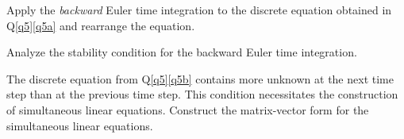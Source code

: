 \listbegin
\item Apply the \textit{backward} Euler time integration to the discrete equation obtained in Q\ref{q5}\ref{q5a} and rearrange the equation.



\item Analyze the stability condition for the backward Euler time integration.



\listclose

	
	\item The discrete equation from Q\ref{q5}\ref{q5b} contains more unknown at the next time step than at the previous time step. This condition necessitates the construction of simultaneous linear equations. Construct the matrix-vector form for the simultaneous linear equations.  
	




\listclose	%

